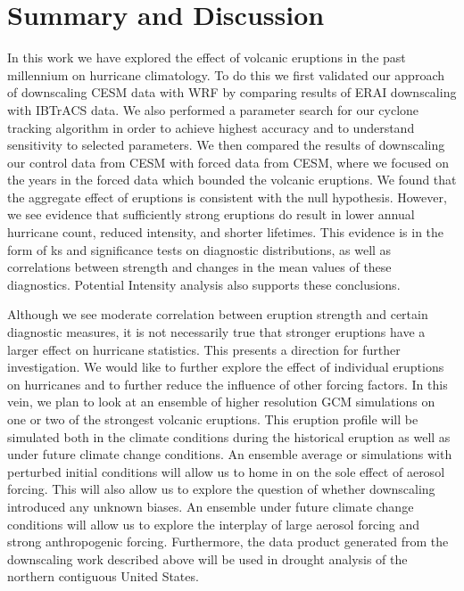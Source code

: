 \section{Summary and Discussion}
\label{discuss}
In this work we have explored the effect of volcanic eruptions in the past millennium on hurricane climatology. To do this we first validated our approach of downscaling CESM data with WRF by comparing results of ERAI downscaling with IBTrACS data. We also performed a parameter search for our cyclone tracking algorithm in order to achieve highest accuracy and to understand sensitivity to selected parameters. We then compared the results of downscaling our control data from CESM with forced data from CESM, where we focused on the years in the forced data which bounded the volcanic eruptions. We found that the aggregate effect of eruptions is consistent with the null hypothesis. However, we see evidence that sufficiently strong eruptions do result in lower annual hurricane count, reduced intensity, and shorter lifetimes. This evidence is in the form of ks and significance tests on diagnostic distributions, as well as correlations between strength and changes in the mean values of these diagnostics. Potential Intensity analysis also supports these conclusions. 
\par
Although we see moderate correlation between eruption strength and certain diagnostic measures, it is not necessarily true that stronger eruptions have a larger effect on hurricane statistics. This presents a direction for further investigation. We would like to further explore the effect of individual eruptions on hurricanes and to further reduce the influence of other forcing factors. In this vein, we plan to look at an ensemble of higher resolution GCM simulations on one or two of the strongest volcanic eruptions. This eruption profile will be simulated both in the climate conditions during the historical eruption as well as under future climate change conditions. An ensemble average or simulations with perturbed initial conditions will allow us to home in on the sole effect of aerosol forcing. This will also allow us to explore the question of whether downscaling introduced any unknown biases. An ensemble under future climate change conditions will allow us to explore the interplay of large aerosol forcing and strong anthropogenic forcing. Furthermore, the data product generated from the downscaling work described above will be used in drought analysis of the northern contiguous United States.   





